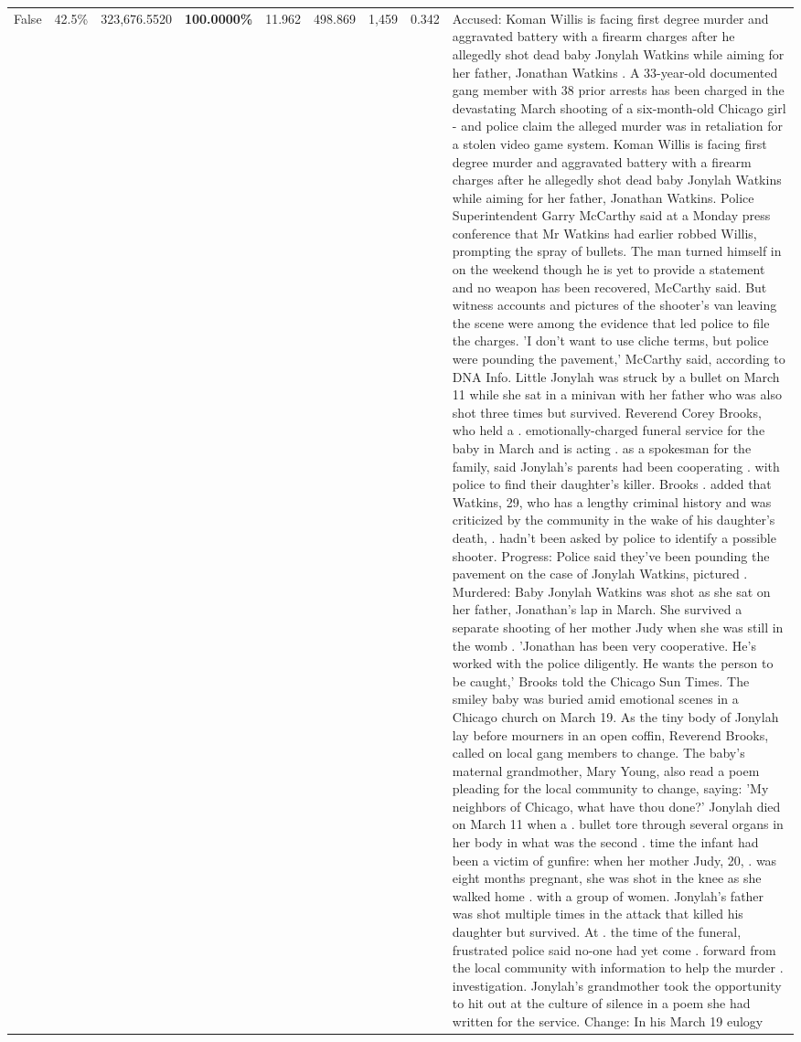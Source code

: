 \begin{table}[H]
\begin{tabular}{lllrlllll}
False & 42.5\% & 323,676.5520 & \bfseries \color{red} 100.0000\% & 11.962 & 498.869 & 1,459 & 0.342 & Accused: Koman Willis is facing first degree murder and aggravated battery with a firearm charges after he allegedly shot dead baby Jonylah Watkins while aiming for her father, Jonathan Watkins . A 33-year-old documented gang member with 38 prior arrests has been charged in the devastating March shooting of a six-month-old Chicago girl - and police claim the alleged murder was in retaliation for a stolen video game system. Koman Willis is facing first degree murder and aggravated battery with a firearm charges after he allegedly shot dead baby Jonylah Watkins while aiming for her father, Jonathan Watkins. Police Superintendent Garry McCarthy said at a Monday press conference that Mr Watkins had earlier robbed Willis, prompting the spray of bullets. The man turned himself in on the weekend though he is yet to provide a statement and no weapon has been recovered, McCarthy said. But witness accounts and pictures of the shooter's van leaving the scene were among the evidence that led police to file the charges. 'I don't want to use cliche terms, but police were pounding the pavement,' McCarthy said, according to DNA Info. Little Jonylah was struck by a bullet on March 11 while she sat in a minivan with her father who was also shot three times but survived. Reverend Corey Brooks, who held a . emotionally-charged funeral service for the baby in March and is acting . as a spokesman for the family, said Jonylah's parents had been cooperating . with police to find their daughter's killer. Brooks . added that Watkins, 29, who has a lengthy criminal history and was criticized by the community in the wake of his daughter's death, . hadn't been asked by police to identify a possible shooter. Progress: Police said they've been pounding the pavement on the case of Jonylah Watkins, pictured . Murdered: Baby Jonylah Watkins was shot as she sat on her father, Jonathan's lap in March. She survived a separate shooting of her mother Judy when she was still in the womb . 'Jonathan has been very cooperative. He's worked with the police diligently. He wants the person to be caught,' Brooks told the Chicago Sun Times. The smiley baby was buried amid emotional scenes in a Chicago church on March 19. As the tiny body of Jonylah lay before mourners in an open coffin, Reverend Brooks, called on local gang members to change. The baby's maternal grandmother, Mary Young, also read a poem pleading for the local community to change, saying: 'My neighbors of Chicago, what have thou done?' Jonylah died on March 11 when a . bullet tore through several organs in her body in what was the second . time the infant had been a victim of gunfire: when her mother Judy, 20, . was eight months pregnant, she was shot in the knee as she walked home . with a group of women. Jonylah's father was shot multiple times in the attack that killed his daughter but survived. At . the time of the funeral, frustrated police said no-one had yet come . forward from the local community with information to help the murder . investigation. Jonylah's grandmother took the opportunity to hit out at the culture of silence in a poem she had written for the service. Change: In his March 19 eulogy 
\end{tabular}
\end{table}
